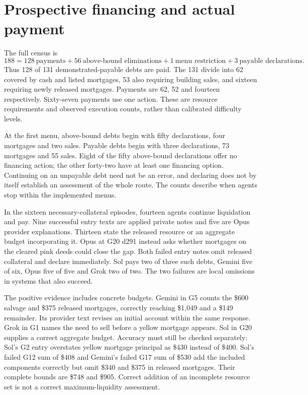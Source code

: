 \documentclass[11pt,letterpaper]{article}
\begin{document}
\section{Prospective financing and actual payment}
The full census is
\[
188=128\ \text{payments}+56\ \text{above-bound eliminations}
 +1\ \text{menu restriction}+3\ \text{payable declarations}.
\]
Thus 128 of 131 demonstrated-payable debts are paid. The 131 divide into 62 covered by cash and listed mortgages, 53 also requiring building sales, and sixteen requiring newly released mortgages. Payments are 62, 52 and fourteen respectively. Sixty-seven payments use one action. These are resource requirements and observed execution counts, rather than calibrated difficulty levels.

At the first menu, above-bound debts begin with fifty declarations, four mortgages and two sales. Payable debts begin with three declarations, 73 mortgages and 55 sales. Eight of the fifty above-bound declarations offer no financing action; the other forty-two have at least one financing option. Continuing on an unpayable debt need not be an error, and declaring does not by itself establish an assessment of the whole route. The counts describe when agents stop within the implemented menus.

In the sixteen necessary-collateral episodes, fourteen agents continue liquidation and pay. Nine successful entry texts are applied private notes and five are Opus provider explanations. Thirteen state the released resource or an aggregate budget incorporating it. Opus at G20 d291 instead asks whether mortgages on the cleared pink deeds could close the gap. Both failed entry notes omit released collateral and declare immediately. Sol pays two of three such debts, Gemini five of six, Opus five of five and Grok two of two. The two failures are local omissions in systems that also succeed.

The positive evidence includes concrete budgets. Gemini in G5 counts the \$600 salvage and \$375 released mortgages, correctly reaching \$1,049 and a \$149 remainder. Its provider text revises an initial account within the same response. Grok in G1 names the need to sell before a yellow mortgage appears. Sol in G20 supplies a correct aggregate budget. Accuracy must still be checked separately: Sol's G2 entry overstates yellow mortgage principal as \$430 instead of \$400. Sol's failed G12 sum of \$408 and Gemini's failed G17 sum of \$530 add the included components correctly but omit \$340 and \$375 in released mortgages. Their complete bounds are \$748 and \$905. Correct addition of an incomplete resource set is not a correct maximum-liquidity assessment.
\end{document}
